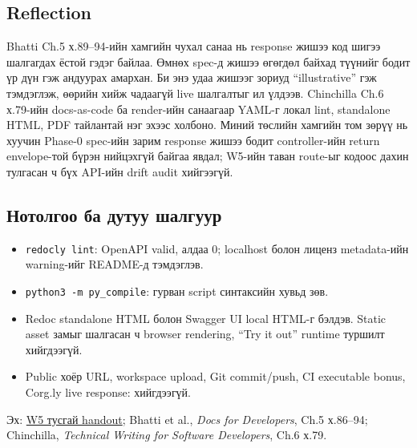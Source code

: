 \documentclass[
  mongolian,
]{article}
\providecommand{\tightlist}{%
  \setlength{\itemsep}{0pt}\setlength{\parskip}{0pt}}
\begin{document}
\subsection{Reflection}\label{reflection}

Bhatti Ch.5 х.89--94-ийн хамгийн чухал санаа нь response жишээ код шигээ
шалгагдах ёстой гэдэг байлаа. Өмнөх spec-д жишээ өгөгдөл байхад түүнийг
бодит үр дүн гэж андуурах амархан. Би энэ удаа жишээг зориуд
``illustrative'' гэж тэмдэглэж, өөрийн хийж чадаагүй live шалгалтыг ил
үлдээв. Chinchilla Ch.6 х.79-ийн docs-as-code ба render-ийн санаагаар
YAML-г локал lint, standalone HTML, PDF тайлантай нэг эхээс холбоно.
Миний төслийн хамгийн том зөрүү нь хуучин Phase-0 spec-ийн зарим
response жишээ бодит controller-ийн return envelope-той бүрэн нийцэхгүй
байгаа явдал; W5-ийн таван route-ыг кодоос дахин тулгасан ч бүх API-ийн
drift audit хийгээгүй.

\subsection{Нотолгоо ба дутуу
шалгуур}\label{ux43dux43eux442ux43eux43bux433ux43eux43e-ux431ux430-ux434ux443ux442ux443ux443-ux448ux430ux43bux433ux443ux443ux440}

\begin{itemize}
\tightlist
\item
  \texttt{redocly\ lint}: OpenAPI valid, алдаа 0; localhost болон лиценз
  metadata-ийн warning-ийг README-д тэмдэглэв.
\item
  \texttt{python3\ -m\ py\_compile}: гурван script синтаксийн хувьд зөв.
\item
  Redoc standalone HTML болон Swagger UI local HTML-г бэлдэв. Static
  asset замыг шалгасан ч browser rendering, ``Try it out'' runtime
  туршилт хийгдээгүй.
\item
  Public хоёр URL, workspace upload, Git commit/push, CI executable
  bonus, Corg.ly live response: хийгдээгүй.
\end{itemize}

Эх:
\href{Sprint\%2005\%20Lab\%20Instructions\%20-\%20OpenAPI\%203.0\%20\%26\%20Bhatti\%20Code\%20Samples.pdf}{W5
тусгай handout}; Bhatti et al., \emph{Docs for Developers}, Ch.5
х.86--94; Chinchilla, \emph{Technical Writing for Software Developers},
Ch.6 х.79.
\end{document}
